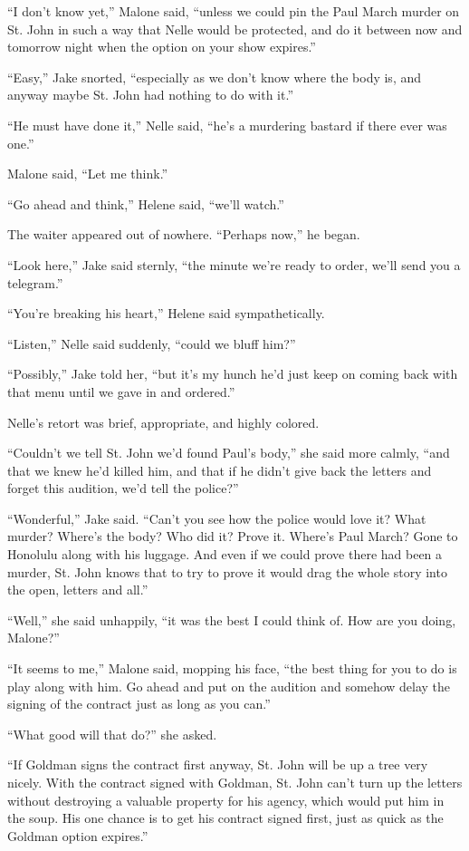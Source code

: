 \documentclass{novel}
\begin{document}
“I don’t know yet,” Malone said, “unless we could pin the Paul March murder on St. John in such a way that Nelle would be protected, and do it between now and tomorrow night when the option on your show expires.”

“Easy,” Jake snorted, “especially as we don’t know where the body is, and anyway maybe St. John had nothing to do with it.”

“He must have done it,” Nelle said, “he’s a murdering bastard if there ever was one.”

Malone said, “Let me think.”

“Go ahead and think,” Helene said, “we’ll watch.”

The waiter appeared out of nowhere. “Perhaps now,” he began.

“Look here,” Jake said sternly, “the minute we’re ready to order, we’ll send you a telegram.”

“You’re breaking his heart,” Helene said sympathetically.

“Listen,” Nelle said suddenly, “could we bluff him?”

“Possibly,” Jake told her, “but it’s my hunch he’d just keep on coming back with that menu until we gave in and ordered.”

Nelle’s retort was brief, appropriate, and highly colored.

“Couldn’t we tell St. John we’d found Paul’s body,” she said more calmly, “and that we knew he’d killed him, and that if he didn’t give back the letters and forget this audition, we’d tell the police?”

“Wonderful,” Jake said. “Can’t you see how the police would love it? What murder? Where’s the body? Who did it? Prove it. Where’s Paul March? Gone to Honolulu along with his luggage. And even if we could prove there had been a murder, St. John knows that to try to prove it would drag the whole story into the open, letters and all.”

“Well,” she said unhappily, “it was the best I could think of. How are you doing, Malone?”

“It seems to me,” Malone said, mopping his face, “the best thing for you to do is play along with him. Go ahead and put on the audition and somehow delay the signing of the contract just as long as you can.”

“What good will that do?” she asked.

“If Goldman signs the contract first anyway, St. John will be up a tree very nicely. With the contract signed with Goldman, St. John can’t turn up the letters without destroying a valuable property for his agency, which would put him in the soup. His one chance is to get his contract signed first, just as quick as the Goldman option expires.”
\end{document}
